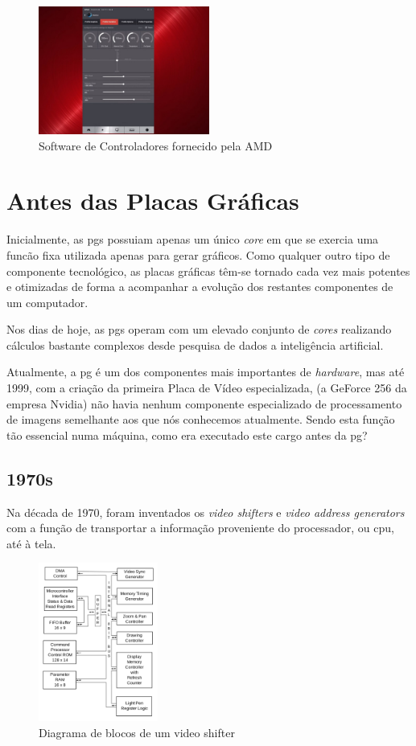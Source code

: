 \documentclass{report}
\begin{document}
\begin{figure}[h]
\centering
\includegraphics[width=0.5\textwidth]{amd.jpg}
\caption{Software de Controladores fornecido pela AMD}
\label{fig:amd}
\end{figure}


\chapter{Antes das Placas Gráficas}
\label{before}

Inicialmente, as \acp{pg} possuiam apenas um único \textit{core} em que se exercia uma funcão fixa utilizada apenas para gerar gráficos.
Como qualquer outro tipo de componente tecnológico, as placas gráficas têm-se tornado cada vez mais potentes e otimizadas de forma a acompanhar a evolução dos restantes componentes de um computador.

Nos dias de hoje, as \acp{pg} operam com um elevado conjunto de \textit{cores} realizando cálculos bastante complexos desde pesquisa de dados a inteligência artificial.

Atualmente, a \ac{pg} é um dos componentes mais importantes de \textit{hardware}, mas até 1999, com a criação da primeira Placa de Vídeo especializada, (a GeForce 256 da empresa Nvidia) não havia nenhum componente especializado de processamento de imagens semelhante aos que nós conhecemos atualmente. 
Sendo esta função tão essencial numa máquina, como era executado este cargo antes da \ac{pg}?

\clearpage
\section{1970s}

Na década de 1970, foram inventados os \textit{video shifters}\cite{shifter} e \textit{video address generators} com a função de transportar a informação proveniente do processador, ou \ac{cpu}, até à tela.
\begin{figure}[h]
\centering
\includegraphics[width=0.35\textwidth]{videoadd.png}
\caption{Diagrama de blocos de um video shifter}
\label{fig:figure2}
\end{figure}
\end{document}
